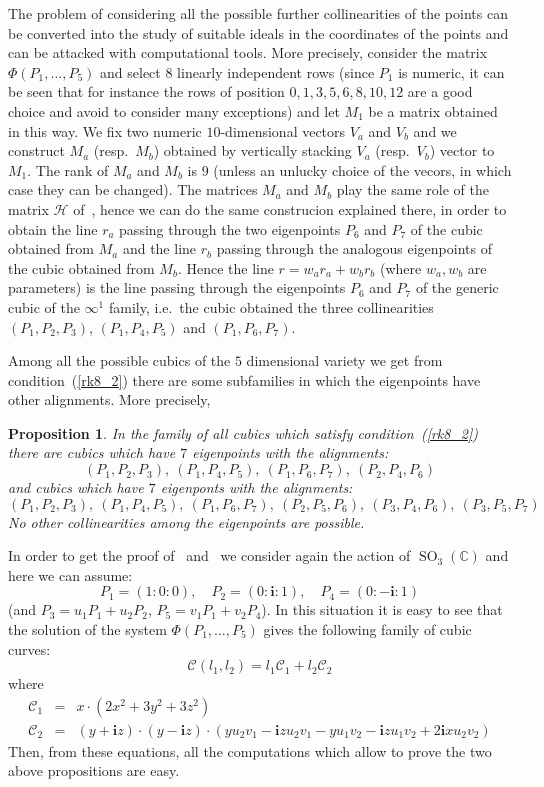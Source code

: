 \documentclass[11pt, a4paper, reqno, captions=tableheading,bibliography=totoc]{scrartcl}
\theoremstyle{plain}
\newtheorem{prop}[lemma]{Proposition}
\theoremstyle{definition}
\newcommand{\C}{\mathbb{C}}
\newcommand{\SO}{\operatorname{SO}}
\newcommand{\iii}{\textbf{i}}
\begin{document}
The problem of considering all the possible further
collinearities of the points can be converted into the study of suitable
ideals in the coordinates of the points and can be attacked with
computational tools. More precisely,
consider the matrix $\Phi(P_1, \dots, P_5)$ and select $8$ linearly independent
rows (since $P_1$ is numeric, it can be seen that for instance the rows
of position $0, 1, 3, 5, 6, 8, 10, 12$ are a good choice and avoid to consider
many exceptions) and let $M_1$ be a matrix obtained in this way.
We fix two numeric $10$-dimensional vectors $V_a$ and $V_b$ and we construct
$M_a$ (resp.\ $M_b$) obtained by vertically stacking $V_a$ (resp.\ $V_b$)
vector to $M_1$. The rank of $M_a$ and $M_b$ is $9$ (unless an unlucky choice
of the vecors, in which case they can be changed). The matrices $M_a$ and
$M_b$ play the same role of the matrix $\mathcal{H}$
of~, hence we can do the same construcion explained
there, in order to obtain the line $r_a$ passing through the two
eigenpoints $P_6$ and $P_7$ of the cubic obtained from $M_a$ and the
line $r_b$ passing through the analogous eigenpoints of the cubic
obtained from $M_b$.
Hence the line $r = w_ar_a+w_br_b$
(where $w_a, w_b$ are parameters) is the line passing through the eigenpoints
$P_6$ and $P_7$
of the generic cubic of the $\infty^1$ family, i.e.\ the cubic obtained
the three collinearities $(P_1, P_2, P_3)$,
$(P_1, P_4, P_5)$ and $(P_1, P_6, P_7)$.

Among all the possible cubics of the $5$ dimensional variety we get from
condition~(\ref{rk8_2}) there are some subfamilies in which the eigenpoints
have other alignments. More precisely,
\begin{prop}
\label{prop:rk8_2B}
In the family of all cubics which satisfy condition~(\ref{rk8_2}) there 
are cubics which have $7$ eigenpoints with the alignments:
\[
(P_1, P_2, P_3),\  (P_1, P_4, P_5),\  (P_1, P_6, P_7),\  (P_2, P_4, P_6)
\]
and cubics which have $7$ eigenponts with the alignments:
\[
(P_1, P_2, P_3),\  (P_1, P_4, P_5), \ (P_1, P_6, P_7),\  (P_2, P_5, P_6),\ 
(P_3, P_4, P_6),\  (P_3, P_5, P_7)
\]
No other collinearities among the eigenpoints are possible.
\end{prop}


In order to get the proof of~ and~
we consider again the action of $\SO_3(\C)$ and here we can assume:
\[
P_1 = (1: 0: 0), \quad P_2 = (0: \iii: 1), \quad P_4 = (0: -\iii: 1)
\]
(and $P_3 = u_1P_1+u_2P_2$, $P_5 = v_1P_1+v_2P_4$). In this situation it
is easy to see that the solution of the system $\Phi(P_1, \dots, P_5)$
gives the following family of cubic curves:
\[
\mathcal{C}(l_1, l_2) = l_1\mathcal{C}_1+l_2\mathcal{C}_2
\]
where
\begin{eqnarray}
  \mathcal{C}_1 & = & x \cdot \left(2x^{2} + 3 y^{2} + 3 z^{2}\right)\\
  \mathcal{C}_2 & = & (y + \iii z) \cdot (y - \iii z)
\cdot (y u_{2} v_{1} - \iii z u_{2} v_{1} - y u_{1} v_{2} - 
\iii z u_{1} v_{2} + 2 \iii x u_{2} v_{2})  \nonumber
\label{famigliaCubDim1}
\end{eqnarray}
Then, from these equations, all the computations which allow to prove
the two above propositions are easy.
\end{document}
